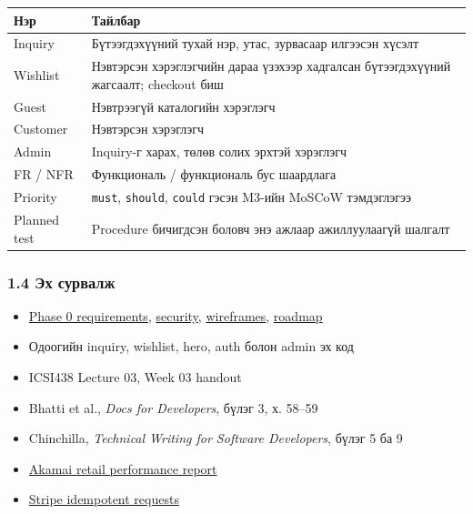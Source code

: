 \documentclass[
  mongolian,
]{article}
\providecommand{\tightlist}{%
  \setlength{\itemsep}{0pt}\setlength{\parskip}{0pt}}
\begin{document}
\begin{longtable}[]{@{}
  >{\raggedright\arraybackslash}p{}
  >{\raggedright\arraybackslash}p{}@{}}
\toprule\noalign{}
\begin{minipage}[b]{\linewidth}\raggedright
Нэр
\end{minipage} & \begin{minipage}[b]{\linewidth}\raggedright
Тайлбар
\end{minipage} \\
\midrule\noalign{}
\endhead
\bottomrule\noalign{}
\endlastfoot
Inquiry & Бүтээгдэхүүний тухай нэр, утас, зурвасаар илгээсэн хүсэлт \\
Wishlist & Нэвтэрсэн хэрэглэгчийн дараа үзэхээр хадгалсан бүтээгдэхүүний
жагсаалт; checkout биш \\
Guest & Нэвтрээгүй каталогийн хэрэглэгч \\
Customer & Нэвтэрсэн хэрэглэгч \\
Admin & Inquiry-г харах, төлөв солих эрхтэй хэрэглэгч \\
FR / NFR & Функциональ / функциональ бус шаардлага \\
Priority & \texttt{must}, \texttt{should}, \texttt{could} гэсэн M3-ийн
MoSCoW тэмдэглэгээ \\
Planned test & Procedure бичигдсэн боловч энэ ажлаар ажиллуулаагүй
шалгалт \\
\end{longtable}

\subsubsection{1.4 Эх
сурвалж}\label{ux44dux445-ux441ux443ux440ux432ux430ux43bux436}

\begin{itemize}
\tightlist
\item
  \href{../phase-0/02-requirements.md}{Phase 0 requirements},
  \href{../phase-0/08-security.md}{security},
  \href{../phase-0/07-uiux-wireframes.md}{wireframes},
  \href{../phase-0/10-roadmap.md}{roadmap}
\item
  Одоогийн inquiry, wishlist, hero, auth болон admin эх код
\item
  ICSI438 Lecture 03, Week 03 handout
\item
  Bhatti et al., \emph{Docs for Developers}, бүлэг 3, х. 58--59
\item
  Chinchilla, \emph{Technical Writing for Software Developers}, бүлэг 5
  ба 9
\item
  \href{https://www.ir.akamai.com/news-releases/news-release-details/akamai-online-retail-performance-report-milliseconds-are}{Akamai
  retail performance report}
\item
  \href{https://docs.stripe.com/api/idempotent_requests}{Stripe
  idempotent requests}
\end{itemize}
\end{document}
